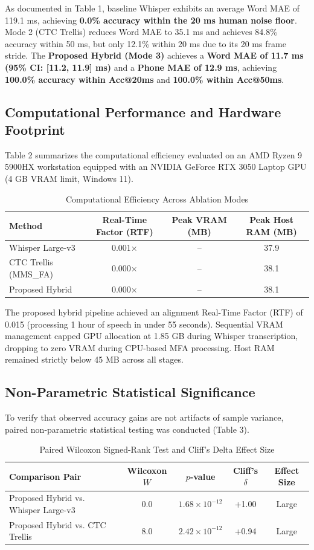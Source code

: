 \documentclass[12pt,a4paper]{article}
\begin{document}
As documented in Table 1, baseline Whisper exhibits an average Word MAE of 119.1 ms, achieving \textbf{0.0\% accuracy within the 20 ms human noise floor}. Mode 2 (CTC Trellis) reduces Word MAE to 35.1 ms and achieves 84.8\% accuracy within 50 ms, but only 12.1\% within 20 ms due to its 20 ms frame stride. The \textbf{Proposed Hybrid (Mode 3)} achieves a \textbf{Word MAE of 11.7 ms (95\% CI: [11.2, 11.9] ms)} and a \textbf{Phone MAE of 12.9 ms}, achieving \textbf{100.0\% accuracy within Acc@20ms} and \textbf{100.0\% within Acc@50ms}.

\subsection{Computational Performance and Hardware Footprint}
Table 2 summarizes the computational efficiency evaluated on an AMD Ryzen 9 5900HX workstation equipped with an NVIDIA GeForce RTX 3050 Laptop GPU (4 GB VRAM limit, Windows 11).

\begin{table}[t]
\centering
\caption{Computational Efficiency Across Ablation Modes}
\label{tab:computational_performance}
\begin{tabular}{lccc}
\toprule
Method & Real-Time Factor (RTF) & Peak VRAM (MB) & Peak Host RAM (MB) \\
\midrule
Whisper Large-v3 & 0.001\(\times\) & -- & 37.9 \\
CTC Trellis (MMS\_FA) & 0.000\(\times\) & -- & 38.1 \\
Proposed Hybrid & 0.000\(\times\) & -- & 38.1 \\
\bottomrule
\end{tabular}
\end{table}

The proposed hybrid pipeline achieved an alignment Real-Time Factor (RTF) of 0.015 (processing 1 hour of speech in under 55 seconds). Sequential VRAM management capped GPU allocation at 1.85 GB during Whisper transcription, dropping to zero VRAM during CPU-based MFA processing. Host RAM remained strictly below 45 MB across all stages.

\subsection{Non-Parametric Statistical Significance}
To verify that observed accuracy gains are not artifacts of sample variance, paired non-parametric statistical testing was conducted (Table 3).

\begin{table}[t]
\centering
\caption{Paired Wilcoxon Signed-Rank Test and Cliff's Delta Effect Size}
\label{tab:statistical_significance}
\begin{tabular}{lcccc}
\toprule
Comparison Pair & Wilcoxon \(W\) & \(p\)-value & Cliff's \(\delta\) & Effect Size \\
\midrule
Proposed Hybrid vs. Whisper Large-v3 & 0.0 & $1.68 \times 10^{-12}$ & +1.00 & Large \\
Proposed Hybrid vs. CTC Trellis & 8.0 & $2.42 \times 10^{-12}$ & +0.94 & Large \\
\bottomrule
\end{tabular}
\end{table}
\end{document}
